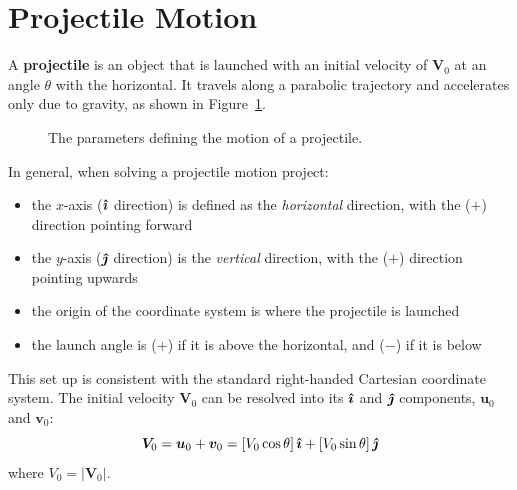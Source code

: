 \section{Projectile Motion}


A \textbf{projectile} is an object that is launched with an initial velocity
of $\bm V_0$ at an angle $\theta$ with the horizontal. It travels along a
parabolic trajectory and accelerates only due to gravity, as shown in
Figure~\ref{fig:projectile}. 
\begin{figure}[ht]
  \centering
  \caption{The parameters defining the motion of a projectile.}
  \label{fig:projectile}
\end{figure}

In general, when solving a projectile motion project:
\begin{itemize}[nosep]
\item the $x$-axis ($\bm{\hat\imath}$ direction) is defined as the \emph{horizontal}
  direction, with the ($+$) direction pointing forward
\item the $y$-axis ($\bm{\hat\jmath}$ direction) is the \emph{vertical} direction, with
  the ($+$) direction pointing upwards
\item the origin of the coordinate system is where the projectile is launched
\item the launch angle is ($+$) if it is above the horizontal, and ($-$) if it
  is below
\end{itemize}
This set up is consistent with the standard right-handed Cartesian coordinate
system. The initial velocity $\bm V_0$ can be resolved into its $\bm{\hat\imath}$ and
$\bm{\hat\jmath}$ components, $\bm u_0$ and $\bm v_0$:
\begin{equation}
  \bm V_0 =\bm u_0+\bm v_0
  =\left[V_0\cos\theta\right]\bm{\hat\imath} + \left[V_0\sin\theta\right]\bm{\hat\jmath}
\end{equation}
where $V_0=|\bm V_0|$.

